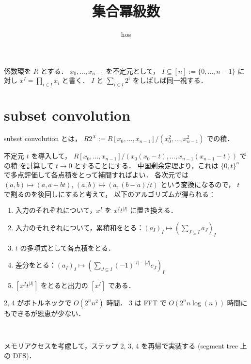 \documentclass{jsarticle}
\title{集合冪級数}
\author{hos}
\newcommand{\abs}[1]{\lvert #1 \rvert}
\begin{document}
\maketitle


係数環を $R$ とする．
$x_0, \ldots, x_{n-1}$ を不定元として，
$I \subseteq [n] := \{0, \ldots, n-1\}$ に対し
$x^I = \prod_{i\in I} x_i$ と書く．
$I$ と $\sum_{i\in I} 2^i$ をしばしば同一視する．

\section{subset convolution}
subset convolution とは，
$R 2^X := R[x_0, \ldots, x_{n-1}] / (x_0^2, \ldots, x_{n-1}^2)$ での積．

不定元 $t$ を導入して，
$R[x_0, \ldots, x_{n-1}] / (x_0(x_0-t), \ldots, x_{n-1}(x_{n-1}-t))$ での積
を計算して $t \to 0$ とすることにする．
中国剰余定理より，これは $\{0, t\}^n$ で多点評価して各点積をとって補間すればよい．
各次元では $(a, b) \mapsto (a, a+bt)$, $(a, b) \mapsto (a, (b-a)/t)$ という変換になるので，
$t$ で割るのを後回しにすると考えて，
以下のアルゴリズムが得られる：
\begin{enumerate}
  \item 入力のそれぞれについて，$x^I$ を $x^I t^{\abs{I}}$ に置き換える．
  \item 入力のそれぞれについて，累積和をとる：$(a_I)_I \mapsto \left(\sum_{J\subseteq I} a_J\right)_I$
  \item $t$ の多項式として各点積をとる．
  \item 差分をとる：$(a_I)_I \mapsto \left(\sum_{J\subseteq I} (-1)^{\abs{I}-\abs{J}} c_J\right)_I$
  \item $[x^I t^{\abs{I}}]$ をとると出力の $[x^I]$ である．
\end{enumerate}

2, 4 がボトルネックで $O(2^n n^2)$ 時間．
3 は FFT で $O(2^n n \log(n))$ 時間にもできるが恩恵が少ない．

\

メモリアクセスを考慮して，ステップ 2, 3, 4 を再帰で実装する (segment tree 上の DFS)．
\end{document}
